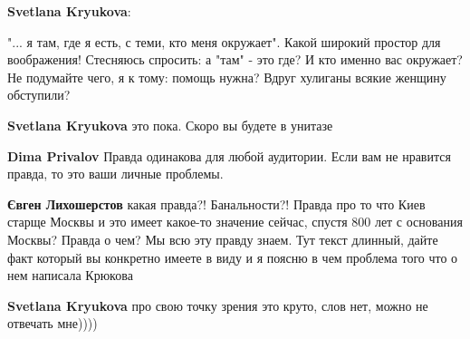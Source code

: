 \begin{itemize}
\begin{itemize}
 
\textbf{Svetlana Kryukova}: 

"... я там, где я есть, с теми, кто меня окружает". Какой широкий простор для
воображения! Стесняюсь спросить: а "там" - это где? И кто именно вас окружает?
Не подумайте чего, я к тому: помощь нужна? Вдруг хулиганы всякие женщину
обступили?


 
\textbf{Svetlana Kryukova} это пока. Скоро вы будете в унитазе

 
\textbf{Dima Privalov} Правда одинакова для любой аудитории. Если вам не нравится правда, то это ваши личные проблемы.

 
\textbf{Євген Лихошерстов} какая правда?! Банальности?! Правда про то что Киев старще Москвы и это имеет какое-то значение сейчас, спустя 800 лет с основания Москвы? Правда о чем?
Мы всю эту правду знаем. Тут текст длинный, дайте факт который вы конкретно имеете в виду и я поясню в чем проблема того что о нем написала Крюкова

 
\textbf{Svetlana Kryukova} про свою точку зрения это круто, слов нет, можно не отвечать мне))))

 

\end{itemize}
\end{itemize}
